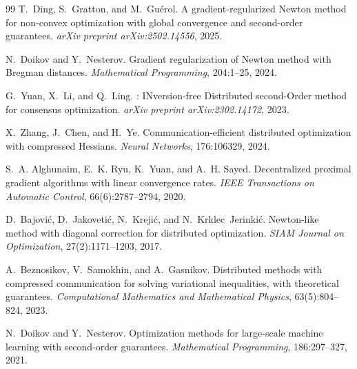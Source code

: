 \documentclass[11pt,a4paper]{article}
\begin{document}
\begin{thebibliography}{99}
		T.~Ding, S.~Gratton, and M.~Gu\'erol.
		\newblock A gradient-regularized {N}ewton method for non-convex optimization with global convergence and second-order guarantees.
		\newblock \emph{arXiv preprint arXiv:2502.14556}, 2025.
		
		N.~Doikov and Y.~Nesterov.
		\newblock Gradient regularization of {N}ewton method with {B}regman distances.
		\newblock \emph{Mathematical Programming}, 204:1--25, 2024.
		
		G.~Yuan, X.~Li, and Q.~Ling.
		: {IN}version-free {D}istributed second-{O}rder method for consensus optimization.
		\newblock \emph{arXiv preprint arXiv:2302.14172}, 2023.
		
		X.~Zhang, J.~Chen, and H.~Ye.
		\newblock Communication-efficient distributed optimization with compressed {H}essians.
		\newblock \emph{Neural Networks}, 176:106329, 2024.
		
		S.~A. Alghunaim, E.~K. Ryu, K.~Yuan, and A.~H. Sayed.
		\newblock Decentralized proximal gradient algorithms with linear convergence rates.
		\newblock \emph{IEEE Transactions on Automatic Control}, 66(6):2787--2794, 2020.
		
		D.~Bajovi{\'c}, D.~Jakoveti{\'c}, N.~Kre\-ji{\'c}, and N.~Krklec~Jerinki{\'c}.
		\newblock Newton-like method with diagonal correction for distributed optimization.
		\newblock \emph{SIAM Journal on Optimization}, 27(2):1171--1203, 2017.
		
		A.~Beznosikov, V.~Samokhin, and A.~Gasnikov.
		\newblock Distributed methods with compressed communication for solving variational inequalities, with theoretical guarantees.
		\newblock \emph{Computational Mathematics and Mathematical Physics}, 63(5):804--824, 2023.
		
		N.~Doikov and Y.~Nesterov.
		\newblock Optimization methods for large-scale machine learning with second-order guarantees.
		\newblock \emph{Mathematical Programming}, 186:297--327, 2021.
		

\end{thebibliography}
\end{document}
